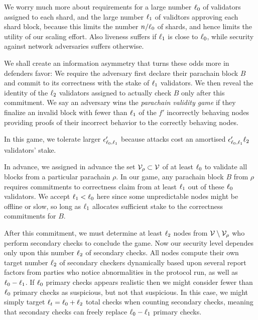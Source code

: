 We worry much more about requirements for a large number $\ell_0$ of validators assigned to each shard, and the large number $\ell_1$ of validtors approving each shard block, because this limits the number $n/\ell_0$ of shards, and hence limits the utility of our scaling effort.  Also liveness suffers if $\ell_1$ is close to $\ell_0$, while security against network adversaries suffers otherwise.

We shall create an information asymmetry that turns these odds more in defenders favor: 
We require the adversary first declare their parachain block $B$ and commit to its correctness with the stake of $\ell_1$ validators.  We then reveal the identity of the $\ell_2$ validators assigned to actually check $B$ only after this commitment.  We say an adversary wins the {\em parachain validity game} if they finalize an invalid block with fewer than $\ell_1$ of the $f'$ incorrectly behaving nodes providing proofs of their incorrect behavior to the correctly behaving nodes. 

In this game, we tolerate larger $\epsilon'_{\ell_0,\ell_1}$ because attacks cost an amortised $\epsilon'_{\ell_0,\ell_1} \ell_2$ validators' stake. 


In advance, we assigned in advance the set $\mathcal{V}_{\rho} \subset \mathcal{V}$ of at least $\ell_0$ to validate all blocks from a particular parachain $\rho$.  
In our game, any parachain block $B$ from $\rho$ requires commitments to correctness claim from at least $\ell_1$ out of these $\ell_0$ validators.  We accept $\ell_1 < \ell_0$ here since some unpredictable nodes might be offline or slow, so long as $\ell_1$ allocates sufficient stake to the correctness commitments for $B$.  

After this commitment, we must determine at least $\ell_2$ nodes from $\mathcal{V} \setminus \mathcal{V}_{\rho}$ who perform secondary checks to conclude the game.  Now our security level dependes only upon this number $\ell_2$ of secondary checks.  
All nodes compute their own target number $\ell_2$ of secondary checkers dynamically based upon several report factors from parties who notice abnormalities in the protocol run, as well as $\ell_0-\ell_1$.  If $\ell_0$ primary checks appears realistic then we might consider fewer than $\ell_0$ primary checks as suspicious, but not that suspicious.  In this case, we might simply target $\ell_t = \ell_0 + \ell_2$ total checks when counting secondary checks, meaning that secondary checks can freely replace $\ell_0-\ell_1$ primary checks.  



